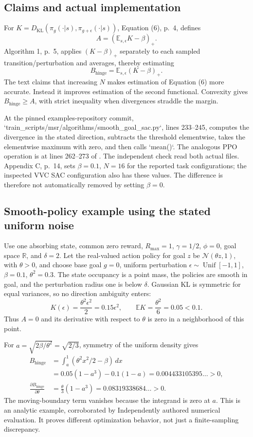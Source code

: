 \documentclass[10pt]{article}
\begin{document}
\subsection*{Claims and actual implementation}
For \(K=D_{\mathrm{KL}}(\pi_g(\cdot|s),\pi_{g+\epsilon}(\cdot|s))\), Equation (6), p. 4, defines \[A=(\mathbb E_{s,\epsilon}K-\beta)_+ .\] Algorithm 1, p. 5, applies \((K-\beta)_+\) separately to each sampled transition/perturbation and averages, thereby estimating \[B_{\mathrm{hinge}}=\mathbb E_{s,\epsilon}(K-\beta)_+ .\] The text claims that increasing \(N\) makes estimation of Equation (6) more accurate. Instead it improves estimation of the second functional. Convexity gives \(B_{\mathrm{hinge}}\ge A\), with strict inequality when divergences straddle the margin.\par
At the pinned examples-repository commit, `train\_scripts/msr/algorithms/smooth\_goal\_sac.py`, lines 233–245, computes the divergence in the stated direction, subtracts the threshold elementwise, takes the elementwise maximum with zero, and then calls `mean()`. The analogous PPO operation is at lines 262–273 of . The independent check read both actual files. Appendix C, p. 14, sets \(\beta=0.1\), \(N=16\) for the reported task configurations; the inspected VVC SAC configuration also has these values. The difference is therefore not automatically removed by setting \(\beta=0\).\par
\subsection*{Smooth-policy example using the stated uniform noise}
Use one absorbing state, common zero reward, \(R_{\max}=1\), \(\gamma=1/2\), \(\phi=0\), goal space \(\mathbb R\), and \(\delta=2\). Let the real-valued action policy for goal \(z\) be \(\mathcal N(\theta z,1)\), with \(\theta>0\), and choose base goal \(g=0\), uniform perturbation \(\epsilon\sim\operatorname{Unif}[-1,1]\), \(\beta=0.1\), \(\theta^2=0.3\). The state occupancy is a point mass, the policies are smooth in goal, and the perturbation radius one is below \(\delta\). Gaussian KL is symmetric for equal variances, so no direction ambiguity enters: \[K(\epsilon)=\frac{\theta^2\epsilon^2}{2}=0.15\epsilon^2,
 \qquad \mathbb EK=\frac{\theta^2}{6}=0.05<0.1 .\] Thus \(A=0\) and its derivative with respect to \(\theta\) is zero in a neighborhood of this point.\par
For \(a=\sqrt{2\beta/\theta^2}=\sqrt{2/3}\), symmetry of the uniform density gives \[\begin{aligned}
 B_{\mathrm{hinge}}
 &=\int_a^1(\theta^2 x^2/2-\beta)\,dx\\
 &=0.05(1-a^3)-0.1(1-a)
   =0.004433105395\ldots>0,\\
 \frac{\partial B_{\mathrm{hinge}}}{\partial\theta}
 &=\frac{\theta}{3}(1-a^3)
   =0.08319338684\ldots>0.\end{aligned}\] The moving-boundary term vanishes because the integrand is zero at \(a\). This is an analytic example, corroborated by Independently authored numerical evaluation. It proves different optimization behavior, not just a finite-sampling discrepancy.\par
\end{document}
